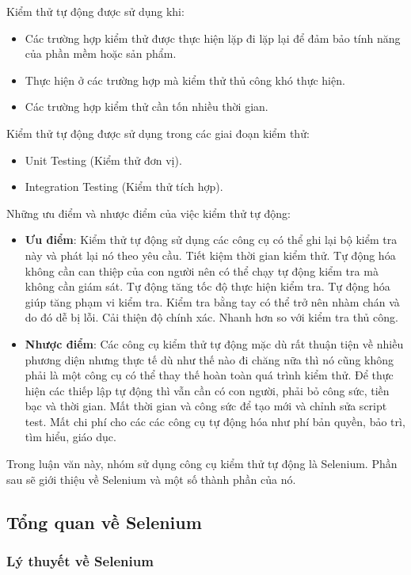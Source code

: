 Kiểm thử tự động được sử dụng khi: 
\begin{itemize}
	\item Các trường hợp kiểm thử được thực hiện lặp đi lặp lại để đảm bảo tính năng của phần mềm hoặc sản phẩm.
	\item Thực hiện ở các trường hợp mà kiểm thử thủ công khó thực hiện.
	\item Các trường hợp kiểm thử cần tốn nhiều thời gian.
\end{itemize}


Kiểm thử tự động được sử dụng trong các giai đoạn kiểm thử:
\begin{itemize}
	\item Unit Testing (Kiểm thử đơn vị).
	\item Integration Testing (Kiểm thử tích hợp).
\end{itemize}


Những ưu điểm và nhược điểm của việc kiểm thử tự động:
\begin{itemize}
	\item \textbf{Ưu điểm}: Kiểm thử tự động sử dụng các công cụ có thể ghi lại bộ kiểm tra này và phát lại nó theo yêu cầu. Tiết kiệm thời gian kiểm thử. Tự động hóa không cần can thiệp của con người nên có thể chạy tự động kiểm tra mà không cần giám sát. Tự động tăng tốc độ thực hiện kiểm tra. Tự động hóa giúp tăng phạm vi kiểm tra. Kiểm tra bằng tay có thể trở nên nhàm chán và do đó dễ bị lỗi. Cải thiện độ chính xác. Nhanh hơn so với kiểm tra thủ công.
	\item \textbf{Nhược điểm}: Các công cụ kiểm thử tự động mặc dù rất thuận tiện về nhiều phương diện nhưng thực tế dù như thế nào đi chăng nữa thì nó cũng không phải là một công cụ có thể thay thế hoàn toàn quá trình kiểm thử. Để thực hiện các thiếp lập tự động thì vẫn cần có con người, phải bỏ công sức, tiền bạc và thời gian. Mất thời gian và công sức để tạo mới và chỉnh sửa script test. Mất chi phí cho các các công cụ tự động hóa như phí bản quyền, bảo trì, tìm hiểu, giáo dục.\\
\end{itemize}

Trong luận văn này, nhóm sử dụng công cụ kiểm thử tự động là Selenium. Phần sau sẽ giới thiệu về Selenium và một số thành phần của nó.


\subsection{Tổng quan về Selenium}
\subsubsection{Lý thuyết về Selenium}

